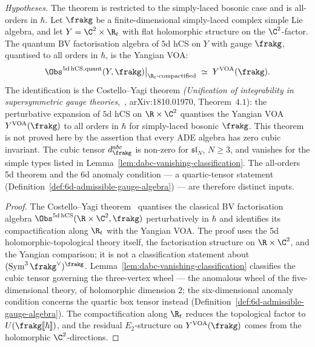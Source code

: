 \begin{theorem}
\label{thm:non-abelian-5d-hcs-yangian-voa}
\noindent\emph{Hypotheses.} The theorem is restricted to the simply-laced bosonic case and is all-orders in $\hbar$.
Let $\frakg$ be a finite-dimensional simply-laced complex simple Lie algebra, and let $Y = \C^2 \times \R_t$ with flat holomorphic structure on the $\C^2$-factor. The quantum BV factorisation algebra of $5$d hCS on $Y$ with gauge $\frakg$, quantised to all orders in $\hbar$, is the Yangian VOA:
\begin{equation}
\label{eq:5d-hcs-yangian-voa-allorders-cytochiral}
 \Obs^{5\mathrm{d\,hCS}, \mathrm{quant}}(Y, \frakg)\big|_{\R_t\text{-compactified}}
 \;\simeq\;
 Y^{\mathrm{VOA}}(\frakg).
\end{equation}
The identification is the Costello--Yagi theorem \emph{(Unification of integrability in supersymmetric gauge theories},~\cite{CostelloYagi2018}, arXiv:1810.01970, Theorem~$4.1$): the perturbative expansion of $5$d hCS on $\R \times \C^2$ quantises the Yangian VOA $Y^{\mathrm{VOA}}(\frakg)$ to all orders in $\hbar$ for simply-laced bosonic $\frakg$. This theorem is not proved here by the assertion that every ADE algebra has zero cubic invariant. The cubic tensor $d^{abc}_\frakg$ is non-zero for $\mathfrak{sl}_{N}$, $N \geq 3$, and vanishes for the simple types listed in Lemma~\ref{lem:dabc-vanishing-classification}. The all-orders 5d theorem and the 6d anomaly condition --- a quartic-tensor statement (Definition~\ref{def:6d-admissible-gauge-algebra}) --- are therefore distinct inputs.
\end{theorem}

\begin{proof}
The Costello--Yagi theorem~\cite{CostelloYagi2018} quantises the classical BV factorisation algebra $\Obs^{5\mathrm{d\,hCS}}(\R \times \C^2, \frakg)$ perturbatively in $\hbar$ and identifies its compactification along $\R_t$ with the Yangian VOA. The proof uses the 5d holomorphic-topological theory itself, the factorisation structure on $\R \times \C^2$, and the Yangian comparison; it is not a classification statement about $(\operatorname{Sym}^3\frakg^\vee)^\frakg$. Lemma~\ref{lem:dabc-vanishing-classification} classifies the cubic tensor governing the three-vertex wheel --- the anomalous wheel of the five-dimensional theory, of holomorphic dimension $2$; the six-dimensional anomaly condition concerns the quartic box tensor instead (Definition~\ref{def:6d-admissible-gauge-algebra}). The compactification along $\R_t$ reduces the topological factor to $U(\frakg[\![\hbar]\!])$, and the residual $E_2$-structure on $Y^{\mathrm{VOA}}(\frakg)$ comes from the holomorphic $\C^2$-directions.
\end{proof}

